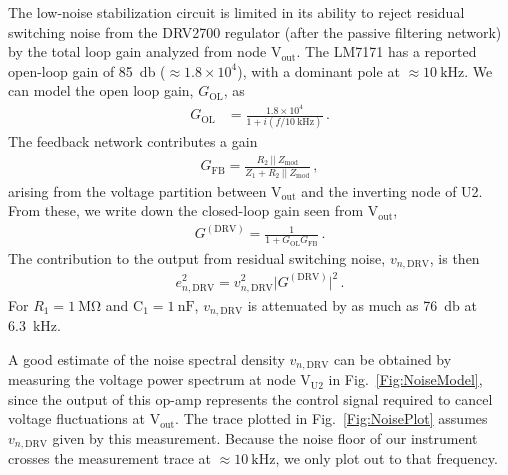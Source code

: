 \documentclass[aip,rsi,reprint]{revtex4-1} %
\begin{document}
The low-noise stabilization circuit is limited in its ability to reject residual switching noise from the DRV2700 regulator (after the passive filtering network) by the total loop gain analyzed from node $\text{V}_\text{out}$.
The LM7171 has a reported open-loop gain of \SI{85}{\decibel} ($\approx 1.8\times 10^4$), with a dominant pole at $\approx\SI{10}{\kilo\hertz}$\cite{LM7171Datasheet}.
We can model the open loop gain, $G_\text{OL}$, as
\begin{align}
G_\text{OL} &= \frac{1.8\times10^4}{1 + i (f/\SI{10}{\kilo\hertz})}\,.
\end{align}
The feedback network contributes a gain
\begin{align}
G_\text{FB} = \frac{R_2~||~Z_\text{mod}}{Z_1 + R_2~||~Z_\text{mod}}\,,
\end{align}
arising from the voltage partition between $\text{V}_\text{out}$ and the inverting node of U2.
From these, we write down the closed-loop gain seen from $\text{V}_\text{out}$,
\begin{align}
G^{(\text{DRV})} = \frac{1}{1+G_\text{OL} G_\text{FB}}\,.
\end{align}
The contribution to the output from residual switching noise, $v_{n,\text{DRV}}$, is then
\begin{align}
e^2_{n,\text{DRV}} = v^2_{n,\text{DRV}}\big|G^{(\text{DRV})}\big|^2\,.
\end{align}
For $R_1=\SI{1}{\mega\ohm}$ and $\text{C}_1 = \SI{1}{\nano\farad}$, $v_{n,\text{DRV}}$ is attenuated by as much as \SI{76}{\decibel} at \SI{6.3}{\kilo\hertz}.

A good estimate of the noise spectral density $v_{n,\text{DRV}}$ can be obtained by measuring the voltage power spectrum at node $\text{V}_\text{U2}$ in Fig.~\ref{Fig:NoiseModel}, since the output of this op-amp represents the control signal required to cancel voltage fluctuations at $\text{V}_\text{out}$.
The trace plotted in Fig.~\ref{Fig:NoisePlot} assumes $v_{n,\text{DRV}}$ given by this measurement. 
Because the noise floor of our instrument crosses the measurement trace at $\approx\SI{10}{\kilo\hertz}$, we only plot out to that frequency.

\end{document}
